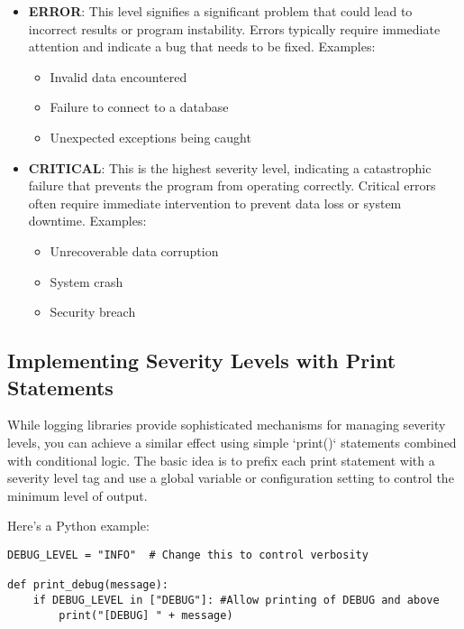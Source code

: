 \documentclass{article}
\begin{document}
{{{\begin{itemize}
\begin{itemize}
            \item Resource limitations being approached (e.g., running low on memory)
        \end{itemize}
    \item \textbf{ERROR}: This level signifies a significant problem that could lead to incorrect results or program instability.  Errors typically require immediate attention and indicate a bug that needs to be fixed. Examples:
        \begin{itemize}
            \item Invalid data encountered
            \item Failure to connect to a database
            \item Unexpected exceptions being caught
        \end{itemize}
    \item \textbf{CRITICAL}: This is the highest severity level, indicating a catastrophic failure that prevents the program from operating correctly.  Critical errors often require immediate intervention to prevent data loss or system downtime. Examples:
        \begin{itemize}
            \item Unrecoverable data corruption
            \item System crash
            \item Security breach
        \end{itemize}
\end{itemize}

\subsection*{Implementing Severity Levels with Print Statements}

While logging libraries provide sophisticated mechanisms for managing severity levels, you can achieve a similar effect using simple `print()` statements combined with conditional logic. The basic idea is to prefix each print statement with a severity level tag and use a global variable or configuration setting to control the minimum level of output.

Here's a Python example:

\begin{verbatim}
DEBUG_LEVEL = "INFO"  # Change this to control verbosity

def print_debug(message):
    if DEBUG_LEVEL in ["DEBUG"]: #Allow printing of DEBUG and above
        print("[DEBUG] " + message)


\end{verbatim}}}}
\end{document}

